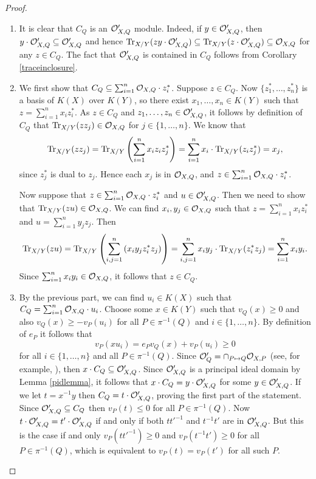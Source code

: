 \begin{proof}
 \begin{enumerate}
  \item It is clear that $C_Q$ is an ${\cal O}_{X,Q}'$ module.
	Indeed, if $y\in {\cal O}_{X,Q}'$, then $y\cdot {\cal O}_{X,Q}' \subseteq {\cal O}_{X,Q}'$ and hence $\operatorname{Tr}_{X/Y}(z y\cdot {\cal O}_{X,Q}')\subseteq \operatorname{Tr}_{X/Y}(z\cdot {\cal O}_{X,Q}') \subseteq {\cal O}_{X,Q}$ for any $z\in C_Q$.
	The fact that ${\cal O}_{X,Q}'$ is contained in $C_Q$ follows from Corollary \ref{traceinclosure}.
  \item We first show that $C_Q \subseteq \sum_{i=1}^n {\cal O}_{X,Q}\cdot z_i^*$.
	Suppose $z\in C_Q$.
	Now $\{z_1^*, \ldots ,z_n^*\}$ is a basis of $K(X)$ over $K(Y)$, so there exist $x_1,\ldots , x_n\in K(Y)$ such that $z=\sum_{i=1}^n x_iz_i^*$.
	As $z\in C_Q$ and $z_1,\ldots ,z_n\in {\cal O}_{X,Q}'$, it follows by definition of $C_Q$ that $\operatorname{Tr}_{X/Y}(zz_j)\in {\cal O}_{X,Q}$ for $j\in \{1,\ldots ,n\}$.
	We know that 
	\[
	 \operatorname{Tr}_{X/Y}(zz_j) = \operatorname{Tr}_{X/Y}\left(\sum_{i=1}^nx_iz_iz_j^*\right) = \sum_{i=1}^nx_i \cdot \operatorname{Tr}_{X/Y}(z_iz_j^*) = x_j,
	\]
	since $z_j^*$ is dual to $z_j$.
	Hence each $x_j$ is in ${\cal O}_{X,Q}$, and $z\in \sum_{i=1}^n{\cal O}_{X,Q}\cdot z_i^*$.
	
	Now suppose that $z\in \sum_{i=1}^n{\cal O}_{X,Q}\cdot z_i^*$ and $u\in {\cal O}_{X,Q}'$.
	Then we need to show that $\operatorname{Tr}_{X/Y}(z u)\in {\cal O}_{X,Q}$.
	We can find $x_i, y_j\in {\cal O}_{X,Q}$ such that $z=\sum_{i=1}^n x_iz_i^*$ and $u=\sum_{i=1}^ny_jz_j$.
	Then
	\[
	 \operatorname{Tr}_{X/Y}(zu) = \operatorname{Tr}_{X/Y}\left(\sum_{i,j=1}^n \left(x_iy_jz_i^*z_j\right)\right) = \sum_{i,j=1}^n x_iy_j\cdot \operatorname{Tr}_{X/Y}(z_i^*z_j) = \sum_{i=1}^n x_iy_i.
	\]
	Since $\sum_{i=1}^n x_iy_i\in {\cal O}_{X,Q}$, it follows that $z\in C_Q$.
  \item By the previous part, we can find $u_i\in K(X)$ such that $C_Q = \sum_{i=1}^n {\cal O}_{X,Q} \cdot u_i$.
	Choose some $x\in K(Y)$ such that $v_Q(x)\geq 0$ and also $v_Q(x)\geq -v_P(u_i)$ for all $P\in \pi^{-1}(Q)$ and $i\in \{1,\ldots ,n\}$.
	By definition of $e_P$ it follows that
	\[ v_P(xu_i) = e_Pv_Q(x) + v_P(u_i) \geq 0\]
	for all $i\in \{1,\ldots, n\}$ and all $P\in \pi^{-1}(Q)$.
	Since ${\cal O}'_Q = \cap_{P\mapsto Q} {\cal O}_{X,P}$ (see, for example, \cite[Cor. III.3.5]{stichtenoth}), then $x\cdot C_Q \subseteq {\cal O}_{X,Q}'$.
	Since ${\cal O}_{X,Q}'$ is a principal ideal domain by Lemma \ref{pidlemma}, it follows that $x\cdot C_Q = y\cdot {\cal O}_{X,Q}'$ for some $y\in {\cal O}_{X,Q}'$.
	If we let $t=x^{-1}y$ then $C_Q =t\cdot {\cal O}_{X,Q}'$, proving the first part of the statement.\\
	Since ${\cal O}_{X,Q}'\subseteq C_Q$ then $v_P(t)\leq 0$ for all $P\in \pi^{-1}(Q)$.
	Now $t\cdot {\cal O}_{X,Q}' = t'\cdot {\cal O}_{X,Q}'$ if and only if both $tt'^{-1}$ and $t^{-1}t'$ are in ${\cal O}_{X,Q}'$.
	But this is the case if and only $v_P(tt'^{-1}) \geq 0$ and $v_P(t^{-1}t')\geq 0$ for all $P\in \pi^{-1}(Q)$, which is equivalent to $v_P(t)=v_P(t')$ for all such $P$.
 \end{enumerate}
\end{proof}

